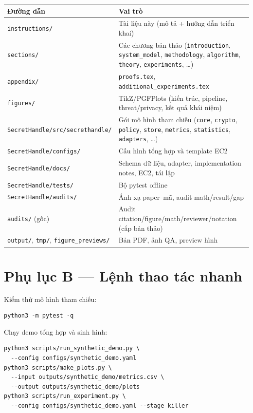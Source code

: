 \documentclass[11pt,a4paper]{article}
\newcommand{\code}[1]{\texttt{\small #1}}
\begin{document}
\begin{longtable}{@{}p{5.0cm}p{9.8cm}@{}}
\toprule
\textbf{Đường dẫn} & \textbf{Vai trò} \\
\midrule
\endhead
\code{instructions/} & Tài liệu này (mô tả + hướng dẫn triển khai) \\
\code{sections/} & Các chương bản thảo (\code{introduction}, \code{system\_model}, \code{methodology},
\code{algorithm}, \code{theory}, \code{experiments}, \dots) \\
\code{appendix/} & \code{proofs.tex}, \code{additional\_experiments.tex} \\
\code{figures/} & TikZ/PGFPlots (kiến trúc, pipeline, threat/privacy, kết quả khái niệm) \\
\code{SecretHandle/src/\allowbreak secrethandle/} & Gói mô hình tham chiếu (\code{core}, \code{crypto}, \code{policy},
\code{store}, \code{metrics}, \code{statistics}, \code{adapters}, \dots) \\
\code{SecretHandle/configs/} & Cấu hình tổng hợp và template EC2 \\
\code{SecretHandle/docs/} & Schema dữ liệu, adapter, implementation notes, EC2, tái lập \\
\code{SecretHandle/tests/} & Bộ pytest offline \\
\code{SecretHandle/audits/} & Ánh xạ paper--mã, audit math/result/gap \\
\code{audits/} (gốc) & Audit citation/figure/math/reviewer/notation (cấp bản thảo) \\
\code{output/}, \code{tmp/}, \code{figure\_previews/} & Bản PDF, ảnh QA, preview hình \\
\bottomrule
\end{longtable}

\section{Phụ lục B --- Lệnh thao tác nhanh}

Kiểm thử mô hình tham chiếu:
\begin{verbatim}
python3 -m pytest -q
\end{verbatim}

Chạy demo tổng hợp và sinh hình:
\begin{verbatim}
python3 scripts/run_synthetic_demo.py \
  --config configs/synthetic_demo.yaml
python3 scripts/make_plots.py \
  --input outputs/synthetic_demo/metrics.csv \
  --output outputs/synthetic_demo/plots
python3 scripts/run_experiment.py \
  --config configs/synthetic_demo.yaml --stage killer
\end{verbatim}
\end{document}
